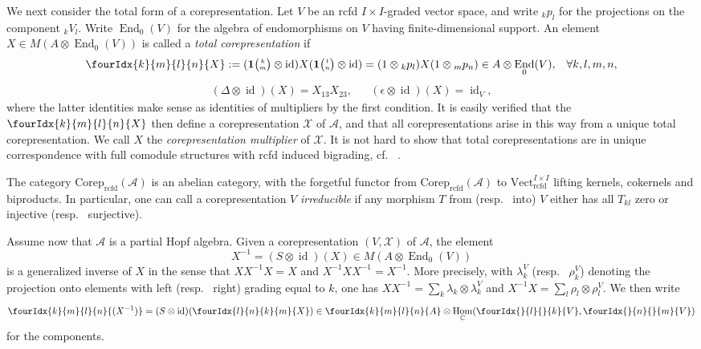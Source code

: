 \documentclass[10pt]{article}
\DeclareMathOperator{\End}{\mathrm{End}}
\DeclareMathOperator{\id}{id}
\DeclareMathOperator{\Hom}{Hom}
\DeclareMathOperator{\rcf}{\mathrm{rcfd}}
\newcommand{\Corep}{\mathrm{Corep}}
\newcommand{\C}{\mathbb{C}}
\newcommand{\Vectrcf}{\mathrm{Vect}^{I\times I}_{\rcf}}
\newcommand{\GrDA}[3]{{}_{#2}#1_{#3}} %
\newcommand{\Grt}[3]{#1{\tiny {\begin{pmatrix} #2\\#3\end{pmatrix}}}}
\newcommand{\UnitC}[2]{\Grt{\mathbf{1}}{#1}{#2}}
\newcommand{\IdCV}[2]{\GrDA{p}{#1}{#2}}
\newcommand{\Gr}[5]{\fourIdx{#2}{#4}{#3}{#5}{#1}}%
\newcommand{\Gru}[3]{\Gr{#1}{}{}{#2}{#3}}
\theoremstyle{definition}
\numberwithin{equation}{section}
\begin{document}
We next consider the total form of a corepresentation. Let $V$ be an rcfd $I\times I$-graded vector space, and write $\IdCV{k}{l}$ for the projections on the component $\GrDA{V}{k}{l}$. Write $\End_0(V)$ for the algebra of endomorphisms on $V$ having finite-dimensional support. An element $X \in  M(A
  \otimes \End_{0}(V))$ is called a \emph{total corepresentation} if \begin{align*} \Gr{X}{k}{l}{m}{n} := (\UnitC{k}{m} \otimes \id){X}(\UnitC{l}{n}
    \otimes \id) = (1 \otimes \IdCV{k}{l}){X}(1 \otimes
    \IdCV{m}{n}) \in A \otimes \End_0(V),&& \forall k,l,m,n,\end{align*} \begin{align*} (\Delta\otimes \id)(X)=X_{13}X_{23}, && (\epsilon \otimes \id)({X}) = \id_{V},\end{align*} where the latter identities make sense as identities of multipliers by the first condition. It is easily verified that the $\Gr{X}{k}{l}{m}{n}$ then define a corepresentation $\mathscr{X}$ of $\mathscr{A}$, and that all corepresentations arise in this way from a unique total corepresentation. We call $X$ the \emph{corepresentation multiplier} of $\mathscr{X}$. It is not hard to show that total corepresentations are in unique correspondence with full comodule structures with rcfd induced bigrading, cf.~ \cite[Definition 2.2, Definition 4.2 and Theorem 4.5]{Boh2}.

The category $\Corep_{\rcf}(\mathscr{A})$ is an abelian category, with the forgetful functor from $\Corep_{\rcf}(\mathscr{A})$ to $\Vectrcf$  lifting kernels, cokernels and biproducts. In particular, one can call a corepresentation $V$ \emph{irreducible} if any morphism $T$ from (resp.~ into) $V$ either has all $T_{kl}$ zero or injective (resp.~ surjective).

Assume now that $\mathscr{A}$ is a partial Hopf algebra. Given a corepresentation $(V,\mathscr{X})$ of $\mathscr{A}$, the element \[X^{-1} =  (S \otimes \id)(X) \in M(A \otimes \End_{0}(V))\] is a generalized inverse of $X$ in the sense that $XX^{-1}X=X$ and $X^{-1}XX^{-1}=X^{-1}$. More precisely, with $\lambda_k^V$ (resp.~ $\rho_k^V$) denoting the projection onto elements with left (resp.~ right) grading equal to $k$, one has $XX^{-1} = \sum_{k} \lambda_{k} \otimes \lambda^{V}_{k}$ and
    $X^{-1}X  = \sum_{l} \rho_{l} \otimes \rho^{V}_{l}$. We then write
   \[\Gr{(X^{-1})}{k}{l}{m}{n}=(S \otimes \id)(\Gr{X}{l}{k}{n}{m}) \in
   \Gr{A}{k}{l}{m}{n} \otimes \Hom_{\C}(\Gru{V}{l}{k},\Gru{V}{n}{m})\] for the components.
\end{document}
